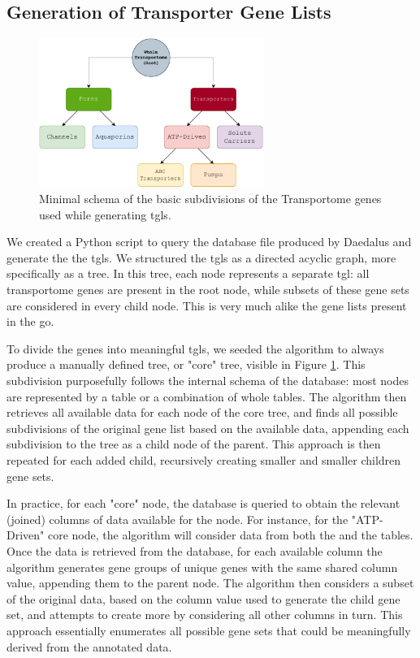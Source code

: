 \subsection{Generation of Transporter Gene Lists}

\begin{figure}
    \centering
    \includegraphics[width=0.65\textwidth]{resources/images/BasicTree.pdf}
    \caption{Minimal schema of the basic subdivisions of the Transportome genes used while generating \glspl{tgl}.}
    \label{fig:BasicTree}
\end{figure}

We created a Python script to query the database file produced by Daedalus and
generate the the \glspl{tgl}. We structured the \glspl{tgl} as a directed
acyclic graph, more specifically as a tree. In this tree, each node represents a
separate \gls{tgl}: all transportome genes are present in the root node, while
subsets of these gene sets are considered in every child node. This is very much
alike the gene lists present in the \gls{go}.

To divide the genes into meaningful \glspl{tgl}, we seeded the algorithm to
always produce a manually defined tree, or "core" tree, visible in Figure
\ref{fig:BasicTree}. This subdivision purposefully follows the internal schema
of the database: most nodes are represented by a table or a combination of whole
tables. The algorithm then retrieves all available data for each node of the
core tree, and finds all possible subdivisions of the original gene list based
on the available data, appending each subdivision to the tree as a child node of
the parent. This approach is then repeated for each added child, recursively
creating smaller and smaller children gene sets.

In practice, for each "core" node, the database is queried to obtain the
relevant (joined) columns of data available for the node. For instance, for the
"ATP-Driven" core node, the algorithm will consider data from both the
 and the  tables. Once
the data is retrieved from the database, for each available column the algorithm
generates gene groups of unique genes with the same shared column value,
appending them to the parent node. The algorithm then considers a subset of the
original data, based on the column value used to generate the child gene set,
and attempts to create more by considering all other columns in turn. This
approach essentially enumerates all possible gene sets that could be
meaningfully derived from the annotated data. 

